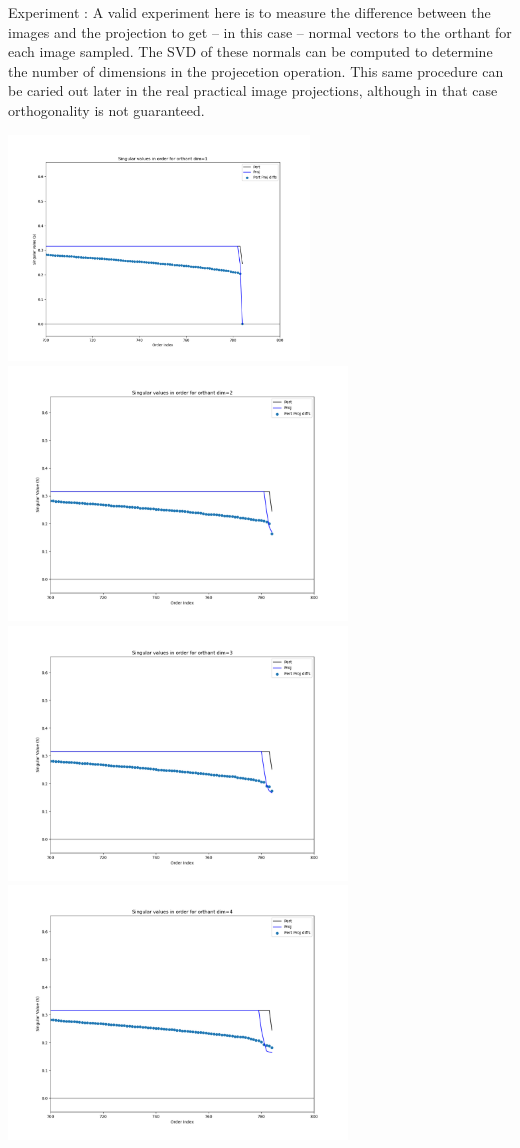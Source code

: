 \documentclass[10pt]{extarticle}
\begin{document}
Experiment : A valid experiment here is to measure the difference between the images and the projection to get -- in this case -- normal vectors to the orthant for each image sampled. The SVD of these normals can be computed to determine the number of dimensions in the projecetion operation. This same procedure can be caried out later in the real practical image projections, although in that case orthogonality is not guaranteed. 

\includegraphics[width=8cm]{img/e03-SVD-Orthant_origin-dim-cropped1.png}
\includegraphics[width=9cm]{img/e03-SVD-Orthant_origin-dim-cropped2.png}
\includegraphics[width=9cm]{img/e03-SVD-Orthant_origin-dim-cropped3.png}
\includegraphics[width=9cm]{img/e03-SVD-Orthant_origin-dim-cropped4.png}
\end{document}
